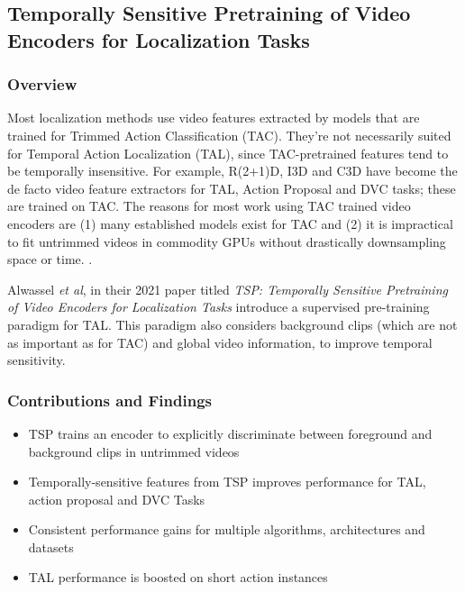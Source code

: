 \subsection{Temporally Sensitive Pretraining of Video Encoders for Localization Tasks}

\subsubsection{Overview}
Most localization methods use video features extracted by models that are trained for Trimmed 
Action Classification (TAC). They're not necessarily suited for Temporal Action Localization 
(TAL), since TAC-pretrained features tend to be temporally insensitive. For example, R(2+1)D, 
I3D and C3D have become the de facto video feature extractors for TAL, Action Proposal and DVC 
tasks; these are trained on TAC. The reasons for most work using TAC trained video encoders 
are (1) many established models exist for TAC and (2) it is impractical to fit untrimmed 
videos in commodity GPUs without drastically downsampling space or time. 
\cite{alwassel2021tsp}. 

\par Alwassel \textit{et al}, in their 2021 paper titled \textit{TSP: Temporally Sensitive 
Pretraining of Video Encoders for Localization Tasks} introduce a supervised pre-training 
paradigm for TAL. This paradigm also considers background clips (which are not as important as 
for TAC) and global video information, to improve temporal sensitivity.

\subsubsection{Contributions and Findings}
\begin{itemize}
\item TSP trains an encoder to explicitly discriminate between foreground and background clips in untrimmed videos
\item Temporally-sensitive features from TSP improves performance for TAL, action proposal and DVC Tasks
\item Consistent performance gains for multiple algorithms, architectures and datasets
\item TAL performance is boosted on short action instances
\end{itemize}

